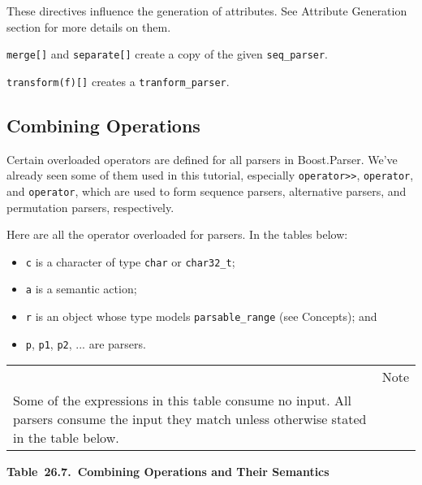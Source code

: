 These directives influence the generation of attributes. See Attribute Generation section for more details on them.

\texttt{merge{[}{]}} and \texttt{separate{[}{]}} create a copy of the given \texttt{seq\_parser}.

\texttt{transform(f){[}{]}} creates a \texttt{tranform\_parser}.

\subsection{Combining Operations}

Certain overloaded operators are defined for all parsers in Boost.Parser. We've already seen some of them used in this tutorial, especially \texttt{operator>>}, \texttt{operator\textbar{}}, and \texttt{operator\textbar{}\textbar{}}, which are used to form sequence parsers, alternative parsers, and permutation parsers, respectively.

Here are all the operator overloaded for parsers. In the tables below:

\begin{itemize}
\item
  \texttt{c} is a character of type \texttt{char} or \texttt{char32\_t};
\item
  \texttt{a} is a semantic action;
\item
  \texttt{r} is an object whose type models \texttt{parsable\_range} (see Concepts); and
\item
  \texttt{p}, \texttt{p1}, \texttt{p2}, ... are parsers.
\end{itemize}

\begin{longtable}[]{@{}
  >{\raggedright\arraybackslash}p{}
  >{\raggedright\arraybackslash}p{}@{}}
\toprule\noalign{}
\endhead
\bottomrule\noalign{}
\endlastfoot
\begin{minipage}[t]{\linewidth}\raggedright
\end{minipage} & Note \\
Some of the expressions in this table consume no input. All parsers consume the input they match unless otherwise stated in the table below. & \\
\end{longtable}

\textbf{Table~26.7.~Combining Operations and Their Semantics}

